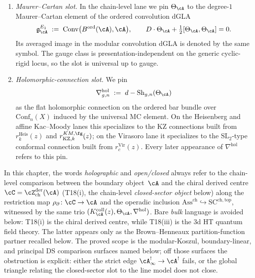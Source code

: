 \begin{enumerate}[label=\textup{(\arabic*)}]
\[ \]
 A classical $r$-matrix is a represented image
 $r_\cA=\rho_\cA(K_\cA^{\mathrm{coll}})$ under
 $H_{\mathrm{CYBE}}^{\mathrm{rep}}(\cA;W)$.  On the affine KZ lane,
 $r^{KM,\fg}_{\mathrm{KZ},k}(z)=
 \Omega_{\mathrm{KZ}}/((k+h^\vee)z)$ after the stated comparison map.
\item \emph{Maurer--Cartan slot.} In the chain-level lane we pin
 $\Theta_\cA$ to the degree-$1$ Maurer--Cartan element of the ordered
 convolution dGLA
 \[
 \mathfrak{g}^{E_1}_\cA
 \;:=\;
 \operatorname{Conv}\bigl(B^{\mathrm{ord}}(\cA),\cA\bigr),
 \qquad
 D\cdot\Theta_\cA + \tfrac{1}{2}[\Theta_\cA,\Theta_\cA]=0.
 \]
 Its averaged image in the modular convolution dGLA is denoted by the
 same symbol. The gauge class is presentation-independent on the
 generic cyclic-rigid locus, so the slot is universal up to gauge.
\item \emph{Holomorphic-connection slot.} We pin
 \[
 \nabla^{\mathrm{hol}}_{g,n}
 \;:=\;
 d-\operatorname{Sh}_{g,n}(\Theta_\cA)
 \]
 as the flat holomorphic connection on the ordered bar bundle over
 $\mathrm{Conf}_n(X)$ induced by the universal MC element. On the
 Heisenberg and affine Kac--Moody lanes this specializes to the KZ
 connections built from $r^{\mathrm{Heis}}_k(z)$ and
 $r^{KM,\fg}_{\mathrm{KZ},k}(z)$; on the Virasoro lane it specializes to the
 $\mathrm{SL}_2$-type conformal connection built from
 $r^{\mathrm{Vir}}_c(z)$. Every later appearance of
 $\nabla^{\mathrm{hol}}$ refers to this pin.
\end{enumerate}

In this chapter, the words \emph{holographic} and \emph{open/closed}
always refer to the chain-level comparison
between the boundary object~$\cA$ and the chiral derived centre
$\cC = \cZ^{\mathrm{der}}_{\mathrm{ch}}(\cA)$ (T18(i), the
chain-level \emph{closed-sector object} below) along the
restriction map $\rho_{\partial}\colon \cC \to \cA$ and the operadic
inclusion $\mathrm{Ass}^{\mathrm{ch}} \hookrightarrow
\mathrm{SC}^{\mathrm{ch,top}}$, witnessed by the same trio
$(K_\cA^{\mathrm{coll}}(z),\Theta_\cA,\nabla^{\mathrm{hol}})$. Bare \emph{bulk}
language is avoided below: T18(i) is the chiral derived centre, while
T18(iii) is the $3$d HT quantum field theory. The latter appears only
as the Brown--Henneaux partition-function partner recalled below. The proved scope is the
modular-Koszul, boundary-linear, and principal DS comparison surfaces
named below; off those surfaces the obstruction is explicit: either the
strict edge $\cA^{!}_\infty \to \cA^!$ fails, or the global triangle
relating the closed-sector slot to the line model does not close.

